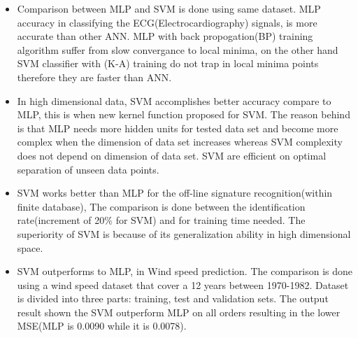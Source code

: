 \begin{itemize}
	
	\item Comparison between MLP and SVM is done using same dataset. MLP accuracy in classifying the ECG(Electrocardiography) signals, is more accurate than other ANN. MLP with back propogation(BP) training algorithm suffer from slow convergance to local minima, on the other hand SVM classifier with (K-A) training do not trap in local minima points therefore they are faster than ANN. \cite{Moavenian20103088}
	\item  In high dimensional data, SVM accomplishes better accuracy compare to MLP, this is when new kernel function proposed for SVM. The reason behind is that MLP needs more hidden units for tested data set and become more complex when the dimension of data set increases whereas SVM complexity does not depend on dimension of data set. SVM are efficient on optimal separation of unseen data points.\cite{Zanaty2012177}
	\item SVM works better than MLP for the off-line signature recognition(within finite database), The comparison is done between the identification rate(increment of 20\% for SVM) and for training time needed. The superiority of SVM is because of its generalization ability in high dimensional space\cite{FriasMartinez2006693}.

	\item SVM outperforms to MLP, in Wind speed prediction. The comparison is done using a wind speed dataset that cover a 12 years between 1970-1982. Dataset is divided into three parts: training, test and validation sets. The output result shown the SVM outperform MLP on all orders resulting in the lower MSE(MLP is 0.0090 while it is 0.0078)\cite{Mohandes2004939}.

	
    

\end{itemize}



	